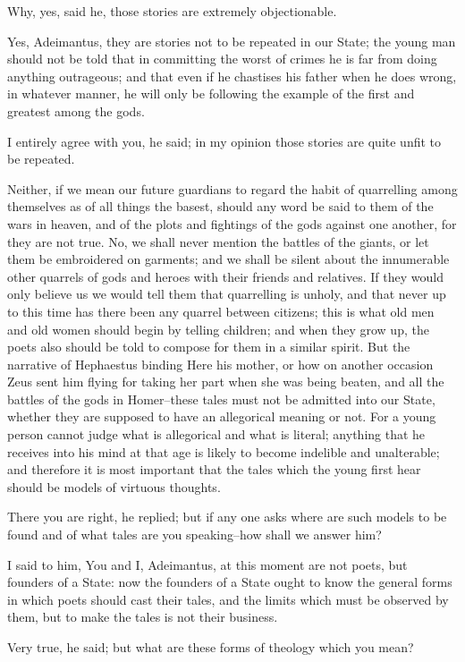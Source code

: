 Why, yes, said he, those stories are extremely objectionable.

Yes, Adeimantus, they are stories not to be repeated in our State; the
young man should not be told that in committing the worst of crimes he
is far from doing anything outrageous; and that even if he chastises his
father when he does wrong, in whatever manner, he will only be following
the example of the first and greatest among the gods.

I entirely agree with you, he said; in my opinion those stories are
quite unfit to be repeated.

Neither, if we mean our future guardians to regard the habit of
quarrelling among themselves as of all things the basest, should
any word be said to them of the wars in heaven, and of the plots and
fightings of the gods against one another, for they are not true. No,
we shall never mention the battles of the giants, or let them be
embroidered on garments; and we shall be silent about the innumerable
other quarrels of gods and heroes with their friends and relatives.
If they would only believe us we would tell them that quarrelling
is unholy, and that never up to this time has there been any quarrel
between citizens; this is what old men and old women should begin by
telling children; and when they grow up, the poets also should be told
to compose for them in a similar spirit. But the narrative of Hephaestus
binding Here his mother, or how on another occasion Zeus sent him flying
for taking her part when she was being beaten, and all the battles of
the gods in Homer--these tales must not be admitted into our State,
whether they are supposed to have an allegorical meaning or not. For
a young person cannot judge what is allegorical and what is literal;
anything that he receives into his mind at that age is likely to become
indelible and unalterable; and therefore it is most important that the
tales which the young first hear should be models of virtuous thoughts.

There you are right, he replied; but if any one asks where are such
models to be found and of what tales are you speaking--how shall we
answer him?

I said to him, You and I, Adeimantus, at this moment are not poets,
but founders of a State: now the founders of a State ought to know the
general forms in which poets should cast their tales, and the limits
which must be observed by them, but to make the tales is not their
business.

Very true, he said; but what are these forms of theology which you mean?

